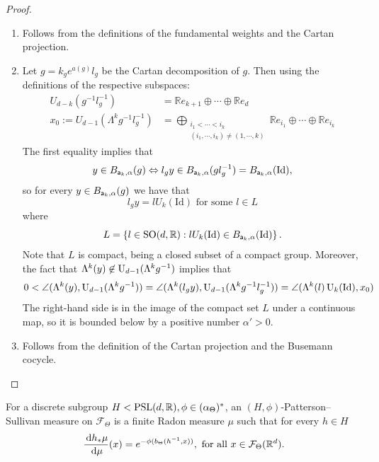 \documentclass{report}
\begin{document}
\begin{proof}
    \begin{enumerate}[label=(\roman*)]
        \item Follows from the definitions of the fundamental weights and the Cartan projection.
        \item Let $g = k_g e^{a(g)} l_g$ be the Cartan decomposition of $g$.
        Then using the definitions of the respective subspaces:
        \begin{align*}
        U_{d-k}(g^{-1}l_g^{-1}) &= \mathbb R e_{k+1} \oplus \cdots \oplus \mathbb R e_d\\
        x_0 := U_{d-1}(\Lambda^k g ^{-1} l_g^{-1}) &= \bigoplus_{\substack{i_1 < \cdots < i_k\\(i_1, \cdots, i_k) \neq (1, \cdots, k)}}\mathbb R e_{i_1} \oplus \cdots \oplus \mathbb R e_{i_k}
        \end{align*}
        The first equality implies that
        \[
        y \in B_{{\sf a}_k, \alpha}(g) \Leftrightarrow l_g y \in B_{{\sf a}_k, \alpha}(g l_g^{-1}) = B_{{\sf a}_k, \alpha}(\mathrm{Id}),
        \]
        so for every $y \in B_{{\sf a}_k, \alpha}(g)$ we have that 
        \[
        l_g y = l U_k(\mathrm{Id}) \text{ for some } l \in L
        \]
        where
        \[
        L = \left\{ l \in \operatorname{{\mathrm{SO}}}(d, \mathbb R) : l U_k(\mathrm{Id}) \in B_{{\sf a}_k, \alpha}(\mathrm{Id}) \right\}.
        \]
        Note that $L$ is compact, being a closed subset of a compact group.
        Moreover, the fact that $\Lambda^k(y) \not \in \operatorname{{\mathrm{U}}}_{d-1}(\Lambda^k g^{-1})$ implies that
        \begin{align*}
            0 < \angle(\Lambda^k(y), \operatorname{{\mathrm{U}}}_{d-1}(\Lambda^k g^{-1})) =
            \angle(\Lambda^k(l_g y), \operatorname{{\mathrm{U}}}_{d-1}(\Lambda^k g^{-1} l_g^{-1})) = \angle(\Lambda^k(l) \operatorname{{\mathrm{U}}}_{k}(\mathrm{Id}), x_0)
        \end{align*}
        The right-hand side is in the image of the compact set $L$ under a continuous map, so it is bounded below by a positive number $\alpha' >0$.
        \item Follows from the definition of the Cartan projection and the Busemann cocycle.
    \end{enumerate}
\end{proof}
\begin{definition}
    For a discrete subgroup $H < \operatorname{{\mathrm{PSL}}}(d, \mathbb R), \phi \in (\alpha_\Theta)^*$,
    an $(H, \phi)$-Patterson--Sullivan measure on $\mathcal F_\Theta$ is a finite Radon measure $\mu$ such that for every $h \in H$
    \[
        \frac{\,\mathrm{d} h_* \mu}{\,\mathrm{d}\mu}(x) = e^{-\phi(b_\Theta(h^{-1},x))}, \text{ for all } x \in \mathcal F_\Theta(\mathbb R^d).
    \]
\end{definition}
\end{document}
